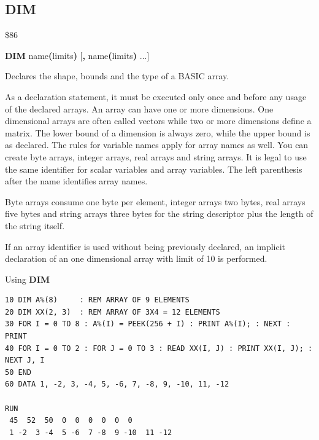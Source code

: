 
\newpage
\subsection{DIM}
\begin{description}[leftmargin=2cm,style=nextline]
\item [Token:]   \$86

\item [Format:]  {\bf DIM} name{\bf(}limits{\bf)} [{\bf,} name{\bf(}limits{\bf)} ...]

\item [Usage:]   Declares the shape, bounds and the type of a BASIC array.

                 As a declaration statement, it must be executed only once and before any usage of the declared arrays. An array can have one or more dimensions. One dimensional arrays are often called vectors while two or more dimensions define a matrix. The lower bound of a dimension is always zero, while the upper bound is as declared. The rules for variable names apply for array names as well. You can create byte arrays, integer arrays, real arrays and string arrays. It is legal to use the same identifier for scalar variables and array variables. The left parenthesis after the name identifies array names.

\item [Remarks:] Byte arrays consume one byte per element, integer arrays two bytes, real arrays five bytes and string arrays three bytes for the string descriptor plus the length of the string itself.

                 If an array identifier is used without being previously declared, an implicit declaration of an one dimensional array with limit of 10 is performed.

\item [Example:] Using {\bf DIM}

\begin{tcolorbox}[colback=black,coltext=white]
\verbatimfont{\codefont}
\begin{verbatim}
10 DIM A%(8)     : REM ARRAY OF 9 ELEMENTS
20 DIM XX(2, 3)  : REM ARRAY OF 3X4 = 12 ELEMENTS
30 FOR I = 0 TO 8 : A%(I) = PEEK(256 + I) : PRINT A%(I); : NEXT : PRINT
40 FOR I = 0 TO 2 : FOR J = 0 TO 3 : READ XX(I, J) : PRINT XX(I, J); : NEXT J, I
50 END
60 DATA 1, -2, 3, -4, 5, -6, 7, -8, 9, -10, 11, -12

RUN
 45  52  50  0  0  0  0  0  0
 1 -2  3 -4  5 -6  7 -8  9 -10  11 -12
\end{verbatim}
\end{tcolorbox}
\end{description}


